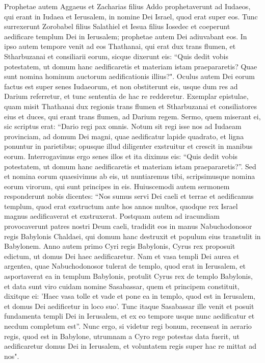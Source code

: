 \begin{biblechapter}  
\verse Prophetae autem Aggaeus et Zacharias filius Addo prophetaverunt ad Iudaeos, qui erant in Iudaea et Ierusalem, in nomine Dei Israel, quod erat super eos. 
\verse Tunc surrexerunt Zorobabel filius Salathiel et Iesua filius Iosedec et coeperunt aedificare templum Dei in Ierusalem; prophetae autem Dei adiuvabant eos. 
\verse In ipso autem tempore venit ad eos Thathanai, qui erat dux trans flumen, et Stharbuzanai et consiliarii eorum, sicque dixerunt eis: “Quis dedit vobis potestatem, ut domum hanc aedificaretis et materiam istam praepararetis?  
\verse Quae sunt nomina hominum auctorum aedificationis illius?". 
\verse Oculus autem Dei eorum factus est super senes Iudaeorum, et non obstiterunt eis, usque dum res ad Darium referretur, et tunc sententia de hac re redderetur. 
\verse Exemplar epistulae, quam misit Thathanai dux regionis trans flumen et Stharbuzanai et consiliatores eius et duces, qui erant trans flumen, ad Darium regem. 
\verse Sermo, quem miserant ei, sic scriptus erat: “Dario regi pax omnis. 
\verse Notum sit regi isse nos ad Iudaeam provinciam, ad domum Dei magni, quae aedificatur lapide quadrato, et ligna ponuntur in parietibus; opusque illud diligenter exstruitur et crescit in manibus eorum.  
\verse Interrogavimus ergo senes illos et ita diximus eis: “Quis dedit vobis potestatem, ut domum hanc aedificaretis et materiam istam praepararetis?”.  
\verse Sed et nomina eorum quaesivimus ab eis, ut nuntiaremus tibi, scripsimusque nomina eorum virorum, qui sunt principes in eis. 
\verse Huiuscemodi autem sermonem responderunt nobis dicentes: “Nos sumus servi Dei caeli et terrae et aedificamus templum, quod erat exstructum ante hos annos multos, quodque rex Israel magnus aedificaverat et exstruxerat. 
\verse Postquam autem ad iracundiam provocaverunt patres nostri Deum caeli, tradidit eos in manus Nabuchodonosor regis Babylonis Chaldaei, qui domum hanc destruxit et populum eius transtulit in Babylonem. 
\verse Anno autem primo Cyri regis Babylonis, Cyrus rex proposuit edictum, ut domus Dei haec aedificaretur. 
\verse Nam et vasa templi Dei aurea et argentea, quae Nabuchodonosor tulerat de templo, quod erat in Ierusalem, et asportaverat ea in templum Babylonis, protulit Cyrus rex de templo Babylonis, et data sunt viro cuidam nomine Sasabassar, quem et principem constituit, 
\verse dixitque ei: 'Haec vasa tolle et vade et pone ea in templo, quod est in Ierusalem, et domus Dei aedificetur in loco suo'. 
\verse Tunc itaque Sasabassar ille venit et posuit fundamenta templi Dei in Ierusalem, et ex eo tempore usque nunc aedificatur et necdum completum est”. 
\verse Nunc ergo, si videtur regi bonum, recenseat in aerario regis, quod est in Babylone, utrumnam a Cyro rege potestas data fuerit, ut aedificaretur domus Dei in Ierusalem, et voluntatem regis super hac re mittat ad nos". 
\end{biblechapter}

